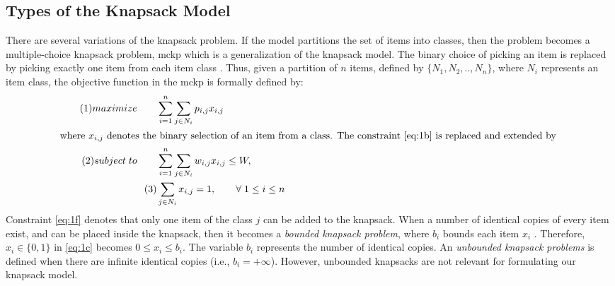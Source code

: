 \subsection{Types of the Knapsack Model}
There are several variations of the knapsack problem. If the model partitions the set of items into classes, then the problem becomes a multiple-choice knapsack problem, \gls{mckp} which is a generalization of the knapsack model. The binary choice of picking an item is replaced by picking exactly one item from each item class \parencite{Kellerer2004TheProblem}. Thus, given a partition of $n$ items, defined by $\{N_1, N_2,.., N_n\}$, where $N_i$ represents an item class, the objective function in the \gls{mckp} is formally defined by:
\begin{align}
    \tag{1}maximize \qquad &\sum_{i=1}^n \sum_{j \in N_i} p_{i,j}x_{i,j}\label{eq:1d}\\
\intertext{where $x_{i,j}$ denotes the binary selection of an item from a class. The constraint \ref{eq:1b} is replaced and extended by }
\tag{2}subject\hspace{0.1cm}  to\qquad &\sum_{i=1}^n \sum_{j \in N_i} w_{i,j}x_{i,j} \leq W,\label{eq:1e} \\
   \tag{3} &\sum_{j \in N_i} x_{i,j} = 1, \qquad \forall \hspace{0.1cm}1 \leq i \leq n\label{eq:1f}
\end{align}
Constraint \ref{eq:1f} denotes that only one item of the class $j$ can be added to the knapsack. When a number of identical copies of every item exist, and can be placed inside the knapsack, then it becomes a \textit{bounded knapsack problem}, where $b_i$ bounds each item $x_i$ \parencite{Kellerer2004TheProblem}. Therefore, $x_i \in \{0,1\}$ in \ref{eq:1c} becomes $0\leq x_i \leq b_i$. The variable $b_i$ represents the number of identical copies. An \textit{unbounded knapsack problems} is defined when there are infinite identical copies (i.e., $b_i = +\infty$). However, unbounded knapsacks are not relevant for formulating our knapsack model.

